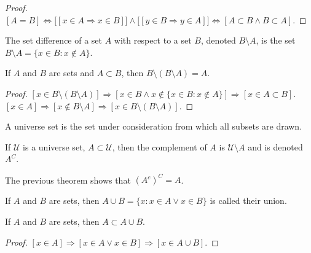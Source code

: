 \documentclass[crop=false,class=book,oneside]{standalone}
\begin{document}
            \begin{proof}
                $[A=B]\Leftrightarrow%
                 \big[[x\in{A}\Rightarrow{x}\in{B}]\big]%
                 \land\big[[y\in{B}\Rightarrow{y}\in{A}]\big]%
                 \Leftrightarrow[A\subset{B}\land{B}\subset{A}]$. 
            \end{proof}
            \begin{definition}
                The set difference of a set $A$ with respect
                to a set $B$, denoted $B\setminus{A}$, is the set
                $B\setminus{A}=\{x\in{B}:x\notin{A}\}$.
            \end{definition}
            \begin{theorem}
                If $A$ and $B$ are sets and $A\subset B$,
                then $B\setminus(B\setminus A)=A$.
            \end{theorem}
            \begin{proof}
                $[x\in B\setminus(B\setminus{A})]%
                 \Rightarrow[x\in{B}\land{x}\notin%
                 \{x\in{B}:x\notin{A}\}]%
                 \Rightarrow[x\in{A}\subset{B}]$.
                 $[x\in{A}]\Rightarrow[x\notin{B}\setminus{A}]%
                 \Rightarrow[x\in{B}\setminus(B\setminus{A})]$.
            \end{proof}
            A universe set is the set under consideration
            from which all subsets are drawn.
            \begin{definition}
                If $\mathcal{U}$ is a universe set,
                $A\subset\mathcal{U}$, then the complement of
                $A$ is $\mathcal{U}\setminus{A}$ and is
                denoted $A^{C}$.
            \end{definition}
            The previous theorem shows that $(A^c)^{C}=A$.
            \begin{definition}
                If $A$ and $B$ are sets, then
                $A\cup{B}=\{x: x\in A \lor x\in B\}$
                is called their union.
            \end{definition}
            \begin{corollary}
                If $A$ and $B$ are sets, then $A\subset{A}\cup{B}$.
            \end{corollary}
            \begin{proof}
                $[x\in A]\Rightarrow[x\in A\lor x\in B]%
                 \Rightarrow[x\in{A}\cup{B}]$.
            \end{proof}
\end{document}
